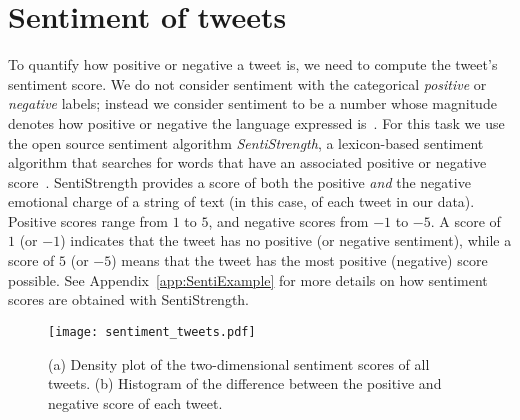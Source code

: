 \documentclass{article}
\begin{document}
\section{Sentiment of tweets}\label{sec:sentimentAnalysis}

To quantify how positive or negative a tweet is, we need to compute
the tweet's sentiment score. We do not consider sentiment with the
categorical {\it positive} or {\it negative} labels; instead we
consider sentiment to be a number whose magnitude denotes how positive
or negative the language expressed is~\cite{pang2005SeeingStars}. For
this task we use the open source sentiment algorithm
\textit{SentiStrength}, a lexicon-based sentiment algorithm that
searches for words that have an associated positive or negative
score~\cite{Thelwall2013SentiStrHeart}. SentiStrength provides a score
of both the positive {\it and} the negative emotional charge of a
string of text (in this case, of each tweet in our data).  Positive
scores range from $1$ to $5$, and negative scores from $-1$ to $-5$. A
score of $1$ (or $-1$) indicates that the tweet has no positive (or
negative sentiment), while a score of $5$ (or $-5$) means that the
tweet has the most positive (negative) score possible. See
Appendix~\ref{app:SentiExample} for more details on how sentiment
scores are obtained with SentiStrength.

\begin{figure}[tp]
	\centering
        \texttt{[image: sentiment\_tweets.pdf]}
        \caption{(a) Density plot of the two-dimensional sentiment
          scores of all tweets. (b) Histogram of the difference between
          the positive and negative score of each
          tweet.}\label{fig:sen_diff_scores}
\end{figure}
\end{document}
